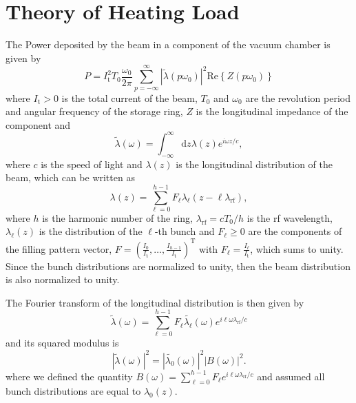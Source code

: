 \documentclass[a4paper,
               biblatex,     %
               ]{jacow}
\providecommand{\der}{\mathrm{d}}
\providecommand{\rf}{\mathrm{rf}}
\providecommand{\Real}[1]{\ensuremath{\mathrm{Re}\left\{#1\right\}}}
\begin{document}
\section{Theory of Heating Load}
    The Power deposited by the beam in a component of the vacuum chamber is given by
    \begin{equation}\label{eq:power_general}
        P = I_\mathrm{t}^2T_0 \frac{\omega_0}{2\pi}\sum_{p=-\infty}^{\infty} \left|\tilde{\lambda}(p\omega_0)\right|^2\Real{Z(p\omega_0)}
    \end{equation}
    where $I_\mathrm{t}>0$ is the total current of the beam, $T_0$ and $\omega_0$ are the revolution period and angular frequency of the storage ring, $Z$ is the longitudinal impedance of the component and 
    \begin{equation}
        \tilde{\lambda}(\omega) = \int_{-\infty}^\infty\der z \lambda(z) e^{i\omega z/c},
    \end{equation}
    where $c$ is the speed of light and $\lambda(z)$ is the longitudinal distribution of the beam, which can be written as
    \begin{equation}
        \lambda(z) = \sum_{\ell=0}^{h-1} F_\ell \lambda_\ell(z - \ell \lambda_\rf),\label{eq:distribution_oneturn}
    \end{equation}
    where $h$ is the harmonic number of the ring, $\lambda_\rf=cT_0/h$ is the rf wavelength, $\lambda_\ell(z)$ is the distribution of the $\ell$-th bunch and $F_\ell \ge 0$ are the components of the filling pattern vector,
    $
    F = \left(\frac{I_0}{I_\mathrm{t}},\dots, \frac{I_{h-1}}{I_\mathrm{t}}\right)^\mathrm{T}
    $
    with $F_\ell = \frac{I_\ell}{I_\mathrm{t}}$, which sums to unity. Since the bunch distributions are normalized to unity, then the beam distribution is also normalized to unity.
    
    The Fourier transform of the longitudinal distribution is then given by
    \begin{equation}
        \tilde{\lambda}(\omega) = \sum_{\ell=0}^{h-1}F_\ell\tilde{\lambda_\ell}(\omega)e^{i\ell\omega \lambda_\rf/c}
    \end{equation}
    and its squared modulus is
    \begin{equation}\label{eq:modulus_squared}
        \left|\tilde{\lambda}(\omega)\right|^2 = \left|\tilde{\lambda_0}(\omega)\right|^2 \left|B(\omega)\right|^2.
    \end{equation}
    where we defined the quantity $B(\omega) = \sum_{\ell=0}^{h-1}F_\ell e^{i\ell\omega \lambda_\rf/c}$
    and assumed all bunch distributions are equal to $\lambda_0(z)$.
\end{document}
